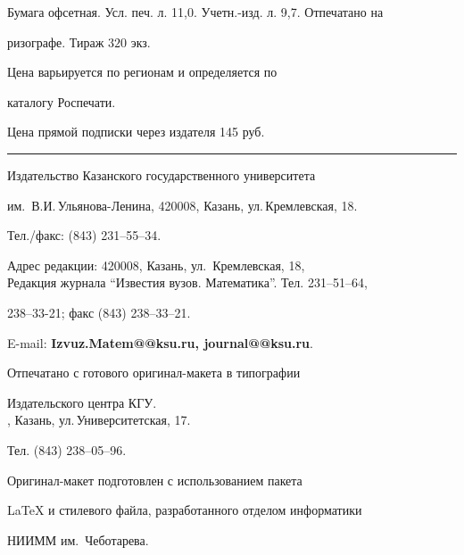 Бумага офсетная. Усл. печ. л. 11,0. Учетн.-изд. л. 9,7. Отпечатано на 


ризографе. Тираж $320$ экз. 





\noindent Цена варьируется по регионам и определяется по 


каталогу Роспечати. 





\noindent Цена прямой подписки через издателя 145 руб. 


\bigskip


\hrule


\bigskip


\noindent Издательство Казанского государственного университета


им.~В.И.\,Ульянова-Ленина, 420008, Казань, ул.\,Кремлевская, 18.


Тел./факс: (843) 231--55--34.\\


\smallskip





\noindent Адрес редакции: 420008, Казань, ул.~Кремлевская, 18,\\  


Редакция журнала  ``Известия вузов. Математика''. Тел. 231--51--64,


238--33-21; факс (843) 238--33--21.





\noindent E-mail: {\bf Izvuz.Matem@@ksu.ru, journal@@ksu.ru}. \par


\bigskip 


\noindent Отпечатано с готового оригинал-макета в типографии


Издательского центра КГУ. \\





, Казань, ул.\,Университетская, 17.


Тел. (843) 238--05--96. \par


\bigskip


\noindent Оригинал-макет подготовлен с использованием пакета


\AmS\LaTeX{} и стилевого файла, разработанного отделом информатики


НИИММ им.~Чеботарева.








